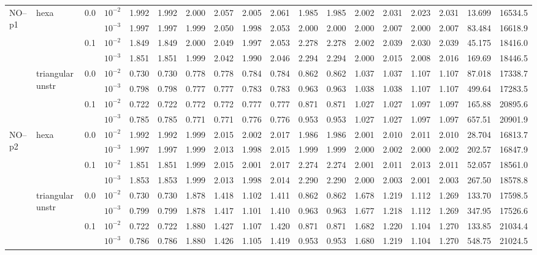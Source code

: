 \begin{longtable}{llclrrrrrrrrrrrrrr}
\multirow{8}{*}{NO--p1} & \multirow{4}{*}{hexa} & \multirow{2}{*}{0.0} & $10^{-2}$ & 1.992 & 1.992 & 2.000 & 2.057 & 2.005 & 2.061 & 1.985 & 1.985 & 2.002 & 2.031 & 2.023 & 2.031 & 13.699 & 16534.5 \\
& & & $10^{-3}$ & 1.997 & 1.997 & 1.999 & 2.050 & 1.998 & 2.053 & 2.000 & 2.000 & 2.000 & 2.007 & 2.000 & 2.007 & 83.484 & 16618.9 \\\cline{3-18}
& & \multirow{2}{*}{0.1} & $10^{-2}$ & 1.849 & 1.849 & 2.000 & 2.049 & 1.997 & 2.053 & 2.278 & 2.278 & 2.002 & 2.039 & 2.030 & 2.039 & 45.175 & 18416.0 \\
& & & $10^{-3}$ & 1.851 & 1.851 & 1.999 & 2.042 & 1.990 & 2.046 & 2.294 & 2.294 & 2.000 & 2.015 & 2.008 & 2.016 & 169.69 & 18446.5 \\\cline{2-18}
& \multirow{4}{*}{triangular unstr} & \multirow{2}{*}{0.0} & $10^{-2}$ & 0.730 & 0.730 & 0.778 & 0.778 & 0.784 & 0.784 & 0.862 & 0.862 & 1.037 & 1.037 & 1.107 & 1.107 & 87.018 & 17338.7 \\
& & & $10^{-3}$ & 0.798 & 0.798 & 0.777 & 0.777 & 0.783 & 0.783 & 0.963 & 0.963 & 1.038 & 1.038 & 1.107 & 1.107 & 499.64 & 17283.5 \\\cline{3-18}
& & \multirow{2}{*}{0.1} & $10^{-2}$ & 0.722 & 0.722 & 0.772 & 0.772 & 0.777 & 0.777 & 0.871 & 0.871 & 1.027 & 1.027 & 1.097 & 1.097 & 165.88 & 20895.6 \\
& & & $10^{-3}$ & 0.785 & 0.785 & 0.771 & 0.771 & 0.776 & 0.776 & 0.953 & 0.953 & 1.027 & 1.027 & 1.097 & 1.097 & 657.51 & 20901.9 \\\hline

\multirow{8}{*}{NO--p2} & \multirow{4}{*}{hexa} & \multirow{2}{*}{0.0} & $10^{-2}$ & 1.992 & 1.992 & 1.999 & 2.015 & 2.002 & 2.017 & 1.986 & 1.986 & 2.001 & 2.010 & 2.011 & 2.010 & 28.704 & 16813.7 \\
& & & $10^{-3}$ & 1.997 & 1.997 & 1.999 & 2.013 & 1.998 & 2.015 & 1.999 & 1.999 & 2.000 & 2.002 & 2.000 & 2.002 & 202.57 & 16847.9 \\\cline{3-18}
& & \multirow{2}{*}{0.1} & $10^{-2}$ & 1.851 & 1.851 & 1.999 & 2.015 & 2.001 & 2.017 & 2.274 & 2.274 & 2.001 & 2.011 & 2.013 & 2.011 & 52.057 & 18561.0 \\
& & & $10^{-3}$ & 1.853 & 1.853 & 1.999 & 2.013 & 1.998 & 2.014 & 2.290 & 2.290 & 2.000 & 2.003 & 2.001 & 2.003 & 267.50 & 18578.8 \\\cline{2-18}
& \multirow{4}{*}{triangular unstr} & \multirow{2}{*}{0.0} & $10^{-2}$ & 0.730 & 0.730 & 1.878 & 1.418 & 1.102 & 1.411 & 0.862 & 0.862 & 1.678 & 1.219 & 1.112 & 1.269 & 133.70 & 17598.5 \\
& & & $10^{-3}$ & 0.799 & 0.799 & 1.878 & 1.417 & 1.101 & 1.410 & 0.963 & 0.963 & 1.677 & 1.218 & 1.112 & 1.269 & 347.95 & 17526.6 \\\cline{3-18}
& & \multirow{2}{*}{0.1} & $10^{-2}$ & 0.722 & 0.722 & 1.880 & 1.427 & 1.107 & 1.420 & 0.871 & 0.871 & 1.682 & 1.220 & 1.104 & 1.270 & 133.85 & 21034.4 \\
& & & $10^{-3}$ & 0.786 & 0.786 & 1.880 & 1.426 & 1.105 & 1.419 & 0.953 & 0.953 & 1.680 & 1.219 & 1.104 & 1.270 & 548.75 & 21024.5 \\\hline


\end{longtable}
